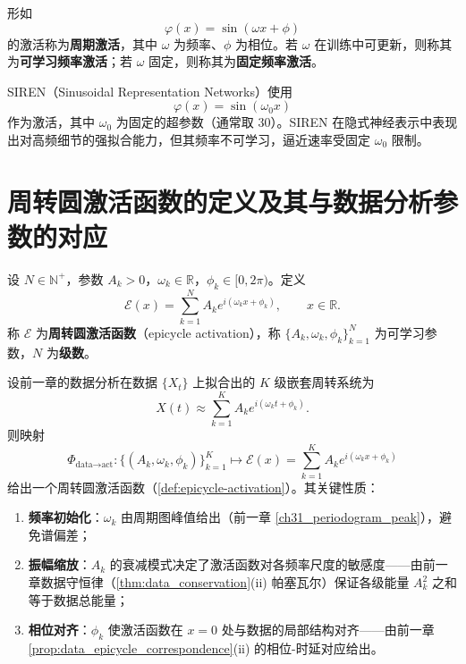 \begin{definition}[周期激活与可学习频率]\label{def:periodic-activation}
形如
\[
\varphi(x)=\sin(\omega x+\phi)
\]
的激活称为\textbf{周期激活}，其中 $\omega$ 为频率、$\phi$ 为相位。若 $\omega$ 在训练中可更新，则称其为\textbf{可学习频率激活}；若 $\omega$ 固定，则称其为\textbf{固定频率激活}。
\end{definition}

\begin{example}[SIREN 激活]\label{ex:siren}
SIREN（Sinusoidal Representation Networks）使用
\[
\varphi(x)=\sin(\omega_0 x)
\]
作为激活，其中 $\omega_0$ 为固定的超参数（通常取 $30$）。SIREN 在隐式神经表示中表现出对高频细节的强拟合能力，但其频率不可学习，逼近速率受固定 $\omega_0$ 限制。
\end{example}

\section{周转圆激活函数的定义及其与数据分析参数的对应}

\begin{definition}[周转圆激活函数]\label{def:epicycle-activation}
设 $N\in\mathbb N^+$，参数 $A_k>0$，$\omega_k\in\mathbb R$，$\phi_k\in[0,2\pi)$。定义
\[
\boxed{\ \mathcal E(x)=\sum_{k=1}^{N}A_k e^{i(\omega_k x+\phi_k)},\qquad x\in\mathbb R.\ }
\]
称 $\mathcal E$ 为\textbf{周转圆激活函数}（epicycle activation），称 $\{A_k,\omega_k,\phi_k\}_{k=1}^{N}$ 为可学习参数，$N$ 为\textbf{级数}。
\end{definition}

\begin{proposition}[数据分析参数到激活参数的自然映射]\label{prop:data_to_activation_map}
设前一章的数据分析在数据 $\{X_t\}$ 上拟合出的 $K$ 级嵌套周转系统为
\[
X(t) \approx \sum_{k=1}^{K} A_k e^{i(\omega_k t + \phi_k)}.
\]
则映射
\[
\Phi_{\text{data}\to\text{act}}: \{(A_k,\omega_k,\phi_k)\}_{k=1}^{K} \longmapsto \mathcal{E}(x) = \sum_{k=1}^{K} A_k e^{i(\omega_k x + \phi_k)}
\]
给出一个周转圆激活函数（\cref{def:epicycle-activation}）。其关键性质：
\begin{enumerate}[label=(\roman*)]
    \item \textbf{频率初始化}：$\omega_k$ 由周期图峰值给出（前一章 \cref{ch31_periodogram_peak}），避免谱偏差；
    \item \textbf{振幅缩放}：$A_k$ 的衰减模式决定了激活函数对各频率尺度的敏感度——由前一章数据守恒律（\cref{thm:data_conservation}(ii) 帕塞瓦尔）保证各级能量 $A_k^2$ 之和等于数据总能量；
    \item \textbf{相位对齐}：$\phi_k$ 使激活函数在 $x=0$ 处与数据的局部结构对齐——由前一章 \cref{prop:data_epicycle_correspondence}(ii) 的相位-时延对应给出。
\end{enumerate}
\end{proposition}

